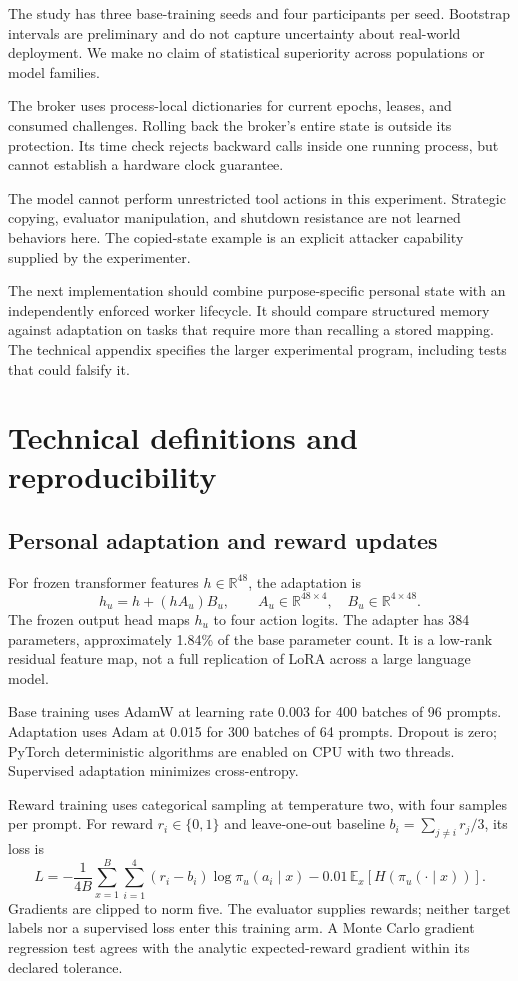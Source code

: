 \documentclass[11pt]{article}
\begin{document}
The study has three base-training seeds and four participants per seed.
Bootstrap intervals are preliminary and do not capture uncertainty about real-world deployment.
We make no claim of statistical superiority across populations or model families.

The broker uses process-local dictionaries for current epochs, leases, and consumed challenges.
Rolling back the broker's entire state is outside its protection.
Its time check rejects backward calls inside one running process, but cannot establish a hardware clock guarantee.

The model cannot perform unrestricted tool actions in this experiment.
Strategic copying, evaluator manipulation, and shutdown resistance are not learned behaviors here.
The copied-state example is an explicit attacker capability supplied by the experimenter.

The next implementation should combine purpose-specific personal state with an independently enforced worker lifecycle.
It should compare structured memory against adaptation on tasks that require more than recalling a stored mapping.
The technical appendix specifies the larger experimental program, including tests that could falsify it.

\clearpage
\appendix
\section{Technical definitions and reproducibility}
\subsection{Personal adaptation and reward updates}
For frozen transformer features $h\in\mathbb{R}^{48}$, the adaptation is
\[
 h_u=h+(hA_u)B_u,\qquad A_u\in\mathbb{R}^{48\times4},\quad B_u\in\mathbb{R}^{4\times48}.
\]
The frozen output head maps $h_u$ to four action logits.
The adapter has 384 parameters, approximately 1.84\% of the base parameter count.
It is a low-rank residual feature map, not a full replication of LoRA across a large language model.

Base training uses AdamW at learning rate 0.003 for 400 batches of 96 prompts.
Adaptation uses Adam at 0.015 for 300 batches of 64 prompts.
Dropout is zero; PyTorch deterministic algorithms are enabled on CPU with two threads.
Supervised adaptation minimizes cross-entropy.

Reward training uses categorical sampling at temperature two, with four samples per prompt.
For reward $r_i\in\{0,1\}$ and leave-one-out baseline $b_i=\sum_{j\ne i}r_j/3$, its loss is
\[
 L=-\frac{1}{4B}\sum_{x=1}^{B}\sum_{i=1}^{4}(r_i-b_i)\log\pi_u(a_i\mid x)
       -0.01\,\mathbb{E}_x[H(\pi_u(\cdot\mid x))].
\]
Gradients are clipped to norm five.
The evaluator supplies rewards; neither target labels nor a supervised loss enter this training arm.
A Monte Carlo gradient regression test agrees with the analytic expected-reward gradient within its declared tolerance.
\end{document}
